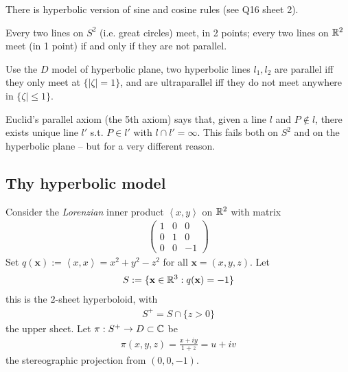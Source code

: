 \documentclass[a4paper]{article}
\begin{document}
There is hyperbolic version of sine and cosine rules (see Q16 sheet 2).

Every two lines on $S^2$ (i.e. great circles) meet, in 2 points; every two lines on $\mathbb{R}^2$ meet (in 1 point) if and only if they are not parallel.

\begin{defi}
Use the $D$ model of hyperbolic plane, two hyperbolic lines $l_1,l_2$ are parallel iff they only meet at $\{|\zeta| = 1\}$, and are ultraparallel iff they do not meet anywhere in $\{\zeta|\leq 1\}$.
\end{defi}

Euclid's parallel axiom (the 5th axiom) says that, given a line $l$ and $P \not\in l$, there exists unique line $l'$ s.t. $P \in l'$ with $l \cap l' = \infty$. This fails both on $S^2$ and on the hyperbolic plane -- but for a very different reason.

\subsection{Thy hyperbolic model}
Consider the \emph{Lorenzian} inner product $\left<x,y\right>$ on $\mathbb{R}^2$ with matrix
\begin{equation*}
\begin{aligned}
\left(\begin{matrix}
1 & 0 & 0\\
0 & 1 & 0\\
0 & 0 & -1
\end{matrix}\right)
\end{aligned}
\end{equation*}
Set $q(\mathbf{x}):=\left<x,x\right> = x^2+y^2-z^2$ for all $\mathbf{x} = (x,y,z)$. Let
\begin{equation*}
\begin{aligned}
S := \{\mathbf{x} \in \mathbb{R}^3 : q(\mathbf{x}) = -1\}
\end{aligned}
\end{equation*}
this is the $2$-sheet hyperboloid, with
\begin{equation*}
\begin{aligned}
S^+ = S \cap \{z>0\}
\end{aligned}
\end{equation*}
the upper sheet. Let $\pi:S^+ \to D \subset \mathbb{C}$ be
\begin{equation*}
\begin{aligned}
\pi(x,y,z) = \frac{x+iy}{1+z} = u+iv
\end{aligned}
\end{equation*}
the stereographic projection from $(0,0,-1)$.
\end{document}
